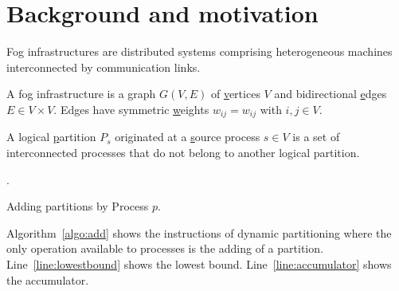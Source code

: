 
\section{Background and motivation}
\label{sec:background}

Fog infrastructures are distributed systems comprising heterogeneous
machines interconnected by communication links.

\begin{definition}
  A fog infrastructure is a \underline{g}raph $G(V, E)$ of
  \underline{v}ertices $V$ and bidirectional \underline{e}dges $E \in
  V \times V$. Edges have symmetric \underline{w}eights $w_{ij} =
  w_{ij}$ with $i, j \in V$.
\end{definition}

\begin{definition}
  A logical \underline{p}artition $P_s$ originated at a
  \underline{s}ource process $s \in V$ is a set of interconnected
  processes that do not belong to another logical partition.
\end{definition}


.

\begin{algorithm}
  
  \caption{\label{algo:add}Adding partitions by Process $p$.}
\end{algorithm}

Algorithm~\ref{algo:add} shows the instructions of dynamic
partitioning where the only operation available to processes is the
adding of a partition.  Line~\ref{line:lowestbound} shows the lowest
bound. Line~\ref{line:accumulator} shows the accumulator.




